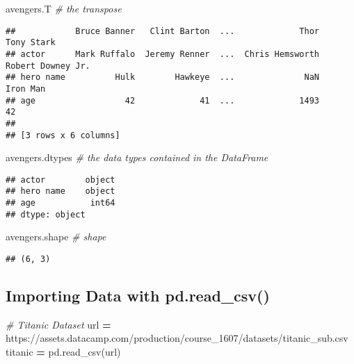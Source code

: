 \documentclass[
]{book}
\newenvironment{Shaded}{\begin{snugshade}}{\end{snugshade}}
\newcommand{\CommentTok}[1]{\textcolor[rgb]{0.56,0.35,0.01}{\textit{#1}}}
\newcommand{\NormalTok}[1]{#1}
\newcommand{\OperatorTok}[1]{\textcolor[rgb]{0.81,0.36,0.00}{\textbf{#1}}}
\newcommand{\StringTok}[1]{\textcolor[rgb]{0.31,0.60,0.02}{#1}}
\begin{document}
\begin{Shaded}
\begin{Highlighting}[]
\NormalTok{avengers.T }\CommentTok{\# the transpose}
\end{Highlighting}
\end{Shaded}

\begin{verbatim}
##            Bruce Banner   Clint Barton  ...             Thor         Tony Stark
## actor      Mark Ruffalo  Jeremy Renner  ...  Chris Hemsworth  Robert Downey Jr.
## hero name          Hulk        Hawkeye  ...              NaN           Iron Man
## age                  42             41  ...             1493                 42
## 
## [3 rows x 6 columns]
\end{verbatim}

\begin{Shaded}
\begin{Highlighting}[]
\NormalTok{avengers.dtypes }\CommentTok{\# the data types contained in the DataFrame}
\end{Highlighting}
\end{Shaded}

\begin{verbatim}
## actor        object
## hero name    object
## age           int64
## dtype: object
\end{verbatim}

\begin{Shaded}
\begin{Highlighting}[]
\NormalTok{avengers.shape }\CommentTok{\# shape}
\end{Highlighting}
\end{Shaded}

\begin{verbatim}
## (6, 3)
\end{verbatim}

\hypertarget{importing-data-with-pd.read_csv}{%
\subsection{Importing Data with pd.read\_csv()}\label{importing-data-with-pd.read_csv}}

\begin{Shaded}
\begin{Highlighting}[]
\CommentTok{\# Titanic Dataset}
\NormalTok{url }\OperatorTok{=} \StringTok{\textquotesingle{}https://assets.datacamp.com/production/course\_1607/datasets/titanic\_sub.csv\textquotesingle{}}
\NormalTok{titanic }\OperatorTok{=}\NormalTok{ pd.read\_csv(url)}
\end{Highlighting}
\end{Shaded}
\end{document}
